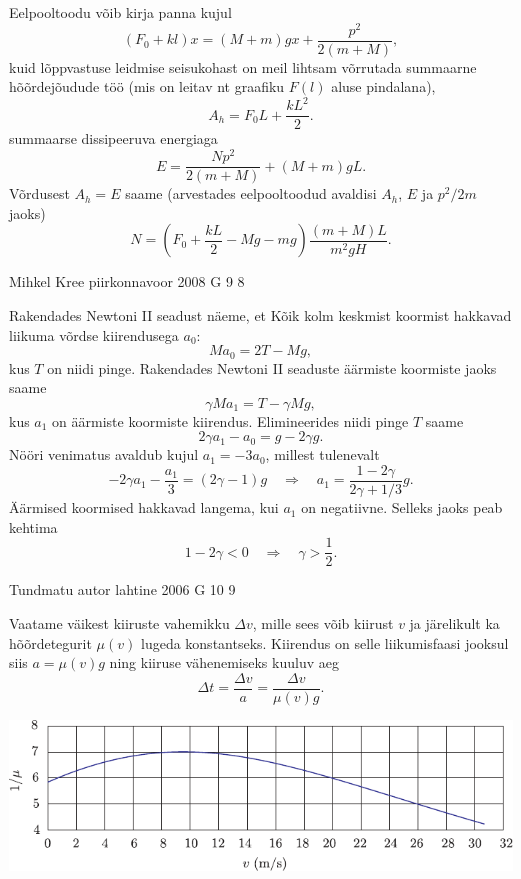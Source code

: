 \documentclass[11pt, twoside]{article}
\begin{document}
{{Eelpooltoodu võib kirja panna kujul
\[
(F_0 + kl)x = (M + m) gx + \frac{p^2}{2(m+M)},
\]
kuid lõppvastuse leidmise seisukohast on meil lihtsam võrrutada summaarne hõõrdejõudude töö (mis on leitav nt graafiku $F(l)$ aluse pindalana),
\[
A_h = F_0L + \frac{kL^2}{2}.
\]
summaarse dissipeeruva energiaga
\[
E=\frac{N p^{2}}{2(m+M)}+(M+m) g L.
\]
Võrdusest $A_h = E$ saame (arvestades eelpooltoodud avaldisi $A_h$, $E$ ja $p^2/2m$ jaoks)
\[
N=\left(F_{0}+\frac{k L}{2}-M g-m g\right) \frac{(m+M) L}{m^{2} g H}.
\]
\fi
}

{Mihkel Kree} %
{piirkonnavoor} %
{2008} %
{G 9} %
{8} %
{

\ifSolution
Rakendades Newtoni II seadust näeme, et Kõik kolm keskmist koormist hakkavad liikuma võrdse kiirendusega $a_0$: 
\[
M a_0 = 2T - Mg,
\]
kus $T$ on niidi pinge. Rakendades Newtoni II seaduste äärmiste koormiste jaoks saame
\[
\gamma M a_1 = T - \gamma Mg,
\]
kus $a_1$ on äärmiste koormiste kiirendus. Elimineerides niidi pinge $T$ saame
\[
2\gamma a_1 - a_0 = g - 2\gamma g.
\] 
Nööri venimatus avaldub kujul $a_1 = -3a_0$, millest tulenevalt 
\[
-2 \gamma a_{1}-\frac{a_{1}}{3}=(2 \gamma-1) g \quad \Rightarrow \quad a_{1}=\frac{1-2 \gamma}{2 \gamma+1 / 3} g.
\]
Äärmised koormised hakkavad langema, kui $a_1$ on negatiivne. Selleks jaoks peab kehtima
\[
1-2 \gamma<0 \quad\Rightarrow\quad \gamma>\frac{1}{2}.
\]
\fi
}

{Tundmatu autor} %
{lahtine} %
{2006} %
{G 10} %
{9} %
{

\ifSolution
\osa Vaatame väikest kiiruste vahemikku $\Delta v$, mille sees võib kiirust $v$ ja järelikult ka hõõrdetegurit $\mu (v)$ lugeda konstantseks. Kiirendus on selle liikumisfaasi jooksul siis $a = \mu (v)g$ ning kiiruse vähenemiseks kuuluv aeg
\[
\Delta t=\frac{\Delta v}{a}=\frac{\Delta v}{\mu(v) g}.
\]

\begin{center}
	\includegraphics[width=\linewidth]{2006-lahg-10-lah1}
\end{center}

}}
\end{document}
